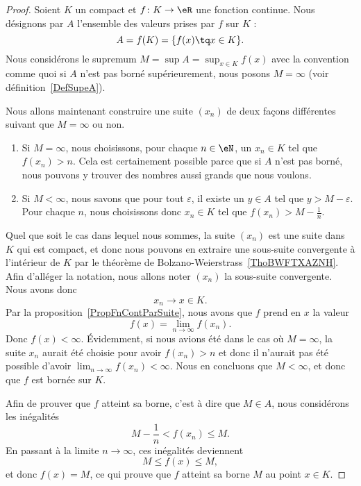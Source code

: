\begin{proof}
	Soient \( K\) un compact et $f\colon K\to \eR$ une fonction continue. Nous désignons par $A$ l'ensemble des valeurs prises par $f$ sur $K$ :
	\begin{equation}
		A=f(K)=\{ f(x)\tq x\in K \}.
	\end{equation}
	Nous considérons le supremum $M=\sup A=\sup_{x\in K}f(x)$ avec la convention comme quoi si $A$ n'est pas borné supérieurement, nous posons $M=\infty$ (voir définition~\ref{DefSupeA}).

	Nous allons maintenant construire une suite $(x_n)$ de deux façons différentes suivant que $M=\infty$ ou non.
	\begin{enumerate}
		\item
			Si $M=\infty$, nous choisissons, pour chaque $n\in\eN$, un $x_n\in K$ tel que $f(x_n)>n$. Cela est certainement possible parce que si $A$ n'est pas borné, nous pouvons y trouver des nombres aussi grands que nous voulons.
		\item
			Si $M<\infty$, nous savons que pour tout $\varepsilon$, il existe un $y\in A$ tel que $y>M-\varepsilon$. Pour chaque $n$, nous choisissons donc $x_n\in K$ tel que $f(x_n)>M-\frac{1}{ n }$.
	\end{enumerate}
    Quel que soit le cas dans lequel nous sommes, la suite $(x_n)$ est une suite dans $K$ qui est compact, et donc nous pouvons en extraire une sous-suite convergente à l'intérieur de \( K\) par le théorème de Bolzano-Weierstrass~\ref{ThoBWFTXAZNH}. Afin d'alléger la notation, nous allons noter $(x_n)$ la sous-suite convergente. Nous avons donc
	\begin{equation}
		x_n\to x\in K.
	\end{equation}
	Par la proposition~\ref{PropFnContParSuite}, nous avons que $f$ prend en \( x\) la valeur
	\begin{equation}
		f(x)=\lim_{n\to \infty} f(x_n).
	\end{equation}
	Donc $f(x)<\infty$. Évidemment, si nous avions été dans le cas où $M=\infty$, la suite $x_n$ aurait été choisie pour avoir $f(x_n)>n$ et donc il n'aurait pas été possible d'avoir $\lim_{n\to \infty} f(x_n)<\infty$. Nous en concluons que $M<\infty$, et donc que $f$ est bornée sur $K$.

	Afin de prouver que $f$ atteint sa borne, c'est à dire que $M\in A$, nous considérons les inégalités
	\begin{equation}
		M-\frac{1}{ n }<f(x_n)\leq M.
	\end{equation}
	En passant à la limite $n\to \infty$, ces inégalités deviennent
	\begin{equation}
		M\leq f(x)\leq M,
	\end{equation}
	et donc $f(x)=M$, ce qui prouve que $f$ atteint sa borne $M$ au point $x\in K$.
\end{proof}

